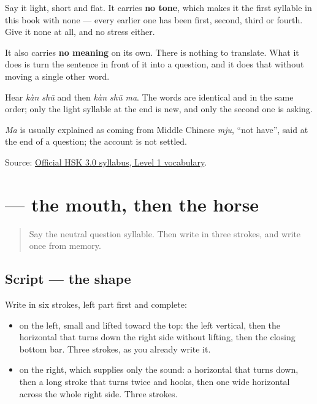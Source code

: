 Say it light, short and flat. It carries \textbf{no tone}, which makes it the first syllable in this book with none — every earlier one has been first, second, third or fourth. Give it none at all, and no stress either.

It also carries \textbf{no meaning} on its own. There is nothing to translate. What it does is turn the sentence in front of it into a question, and it does that without moving a single other word.

Hear \emph{kàn shū} and then \emph{kàn shū ma}. The words are identical and in the same order; only the light syllable at the end is new, and only the second one is asking.

\emph{Ma} is usually explained as coming from Middle Chinese \emph{mju}, \textquotedblleft{}not have\textquotedblright{}, said at the end of a question; the account is not settled.

\begin{tcolorbox}[breakable,colback=teal!4,colframe=teal!35!black,title={Before you move on}]
Source: \href{https://hsk.cn-bj.ufileos.com/3.0/\%E6\%96\%B0\%E7\%89\%88HSK\%E8\%80\%83\%E8\%AF\%95\%E5\%A4\%A7\%E7\%BA\%B21219.pdf}{Official HSK 3.0 syllabus, Level 1 vocabulary}.
\end{tcolorbox}
\section[\texorpdfstring{\zh{吗} (ma)}{吗 (ma)}]{ — the mouth, then the horse}

\label{lesson:ZH-W19-ma-observe}



\begin{quote}
Say the neutral question syllable. Then write  in three strokes, and write  once from memory.
\end{quote}

\subsection*{Script — the shape}

Write \textbf{} in six strokes, left part first and complete:

\begin{itemize}
\raggedright
  \item \textbf{} on the left, small and lifted toward the top: the left vertical, then the horizontal that turns down the right side without lifting, then the closing bottom bar. Three strokes, as you already write it.
  \item \textbf{} on the right, which supplies only the sound: a horizontal that turns down, then a long stroke that turns twice and hooks, then one wide horizontal across the whole right side. Three strokes.
\end{itemize}

